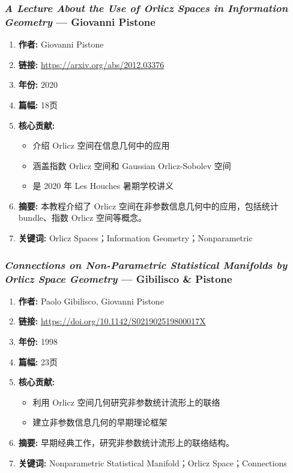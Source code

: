 \subsubsection{\textbf{\textit{A Lecture About the Use of Orlicz Spaces in Information Geometry}} — Giovanni Pistone}
\begin{enumerate}
    \item \textbf{作者:} Giovanni Pistone
    \item \textbf{链接:} \url{https://arxiv.org/abs/2012.03376}
    \item \textbf{年份:} 2020
    \item \textbf{篇幅:} 18页
    \item \textbf{核心贡献:}
        \begin{itemize}
            \item 介绍 Orlicz 空间在信息几何中的应用
            \item 涵盖指数 Orlicz 空间和 Gaussian Orlicz-Sobolev 空间
            \item 是 2020 年 Les Houches 暑期学校讲义
        \end{itemize}
    \item \textbf{摘要:} 本教程介绍了 Orlicz 空间在非参数信息几何中的应用，包括统计 bundle、指数 Orlicz 空间等概念。
    \item \textbf{关键词:} Orlicz Spaces；Information Geometry；Nonparametric
\end{enumerate}

\subsubsection{\textbf{\textit{Connections on Non-Parametric Statistical Manifolds by Orlicz Space Geometry}} — Gibilisco \& Pistone}
\begin{enumerate}
    \item \textbf{作者:} Paolo Gibilisco, Giovanni Pistone
    \item \textbf{链接:} \url{https://doi.org/10.1142/S021902519800017X}
    \item \textbf{年份:} 1998
    \item \textbf{篇幅:} 23页
    \item \textbf{核心贡献:}
        \begin{itemize}
            \item 利用 Orlicz 空间几何研究非参数统计流形上的联络
            \item 建立非参数信息几何的早期理论框架
        \end{itemize}
    \item \textbf{摘要:} 早期经典工作，研究非参数统计流形上的联络结构。
    \item \textbf{关键词:} Nonparametric Statistical Manifold；Orlicz Space；Connections
\end{enumerate}

